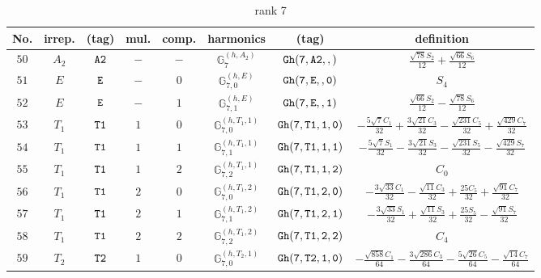 \documentclass[fleqn,8pt]{jsarticle}
\begin{document}
\begin{table}[ht!]
\begin{center}
\caption{rank 7}
\renewcommand{\arraystretch}{1.3}
\begin{tabular}{cccccccc} \hline \hline
No. & irrep. & (tag) & mul. & comp. & harmonics & (tag) & definition \\ \hline
$ 50 $ & $ A_{2} $ & $ {\tt A2} $ & $ - $ & $ - $ & $ \mathbb{G}_{7}^{(h,A_{2})} $ & $ {\tt Gh(7,A2,,)} $ & $ \frac{\sqrt{78} S_{2}}{12} + \frac{\sqrt{66} S_{6}}{12} $ \\
$ 51 $ & $ E $ & $ {\tt E} $ & $ - $ & $ 0 $ & $ \mathbb{G}_{7,0}^{(h,E)} $ & $ {\tt Gh(7,E,,0)} $ & $ S_{4} $ \\
$ 52 $ & $ E $ & $ {\tt E} $ & $ - $ & $ 1 $ & $ \mathbb{G}_{7,1}^{(h,E)} $ & $ {\tt Gh(7,E,,1)} $ & $ \frac{\sqrt{66} S_{2}}{12} - \frac{\sqrt{78} S_{6}}{12} $ \\
$ 53 $ & $ T_{1} $ & $ {\tt T1} $ & $ 1 $ & $ 0 $ & $ \mathbb{G}_{7,0}^{(h,T_{1},1)} $ & $ {\tt Gh(7,T1,1,0)} $ & $ - \frac{5 \sqrt{7} C_{1}}{32} + \frac{3 \sqrt{21} C_{3}}{32} - \frac{\sqrt{231} C_{5}}{32} + \frac{\sqrt{429} C_{7}}{32} $ \\
$ 54 $ & $ T_{1} $ & $ {\tt T1} $ & $ 1 $ & $ 1 $ & $ \mathbb{G}_{7,1}^{(h,T_{1},1)} $ & $ {\tt Gh(7,T1,1,1)} $ & $ - \frac{5 \sqrt{7} S_{1}}{32} - \frac{3 \sqrt{21} S_{3}}{32} - \frac{\sqrt{231} S_{5}}{32} - \frac{\sqrt{429} S_{7}}{32} $ \\
$ 55 $ & $ T_{1} $ & $ {\tt T1} $ & $ 1 $ & $ 2 $ & $ \mathbb{G}_{7,2}^{(h,T_{1},1)} $ & $ {\tt Gh(7,T1,1,2)} $ & $ C_{0} $ \\
$ 56 $ & $ T_{1} $ & $ {\tt T1} $ & $ 2 $ & $ 0 $ & $ \mathbb{G}_{7,0}^{(h,T_{1},2)} $ & $ {\tt Gh(7,T1,2,0)} $ & $ - \frac{3 \sqrt{33} C_{1}}{32} - \frac{\sqrt{11} C_{3}}{32} + \frac{25 C_{5}}{32} + \frac{\sqrt{91} C_{7}}{32} $ \\
$ 57 $ & $ T_{1} $ & $ {\tt T1} $ & $ 2 $ & $ 1 $ & $ \mathbb{G}_{7,1}^{(h,T_{1},2)} $ & $ {\tt Gh(7,T1,2,1)} $ & $ - \frac{3 \sqrt{33} S_{1}}{32} + \frac{\sqrt{11} S_{3}}{32} + \frac{25 S_{5}}{32} - \frac{\sqrt{91} S_{7}}{32} $ \\
$ 58 $ & $ T_{1} $ & $ {\tt T1} $ & $ 2 $ & $ 2 $ & $ \mathbb{G}_{7,2}^{(h,T_{1},2)} $ & $ {\tt Gh(7,T1,2,2)} $ & $ C_{4} $ \\
$ 59 $ & $ T_{2} $ & $ {\tt T2} $ & $ 1 $ & $ 0 $ & $ \mathbb{G}_{7,0}^{(h,T_{2},1)} $ & $ {\tt Gh(7,T2,1,0)} $ & $ - \frac{\sqrt{858} C_{1}}{64} - \frac{3 \sqrt{286} C_{3}}{64} - \frac{5 \sqrt{26} C_{5}}{64} - \frac{\sqrt{14} C_{7}}{64} $ \\

\end{tabular}
\end{center}
\end{table}
\end{document}
